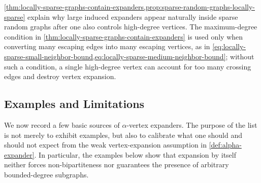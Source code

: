 \cref{thm:locally-sparse-graphs-contain-expanders,prop:sparse-random-graphs-locally-sparse} explain why large induced expanders appear naturally inside sparse random graphs after one also controls high-degree vertices. The maximum-degree condition in \cref{thm:locally-sparse-graphs-contain-expanders} is used only when converting many escaping edges into many escaping vertices, as in \cref{eq:locally-sparse-small-neighbor-bound,eq:locally-sparse-medium-neighbor-bound}; without such a condition, a single high-degree vertex can account for too many crossing edges and destroy vertex expansion.

\subsection{Examples and Limitations}
\label{subsec:examples-alpha-expanders}

We now record a few basic sources of \(\alpha\)-vertex expanders. The purpose of the list is not merely to exhibit examples, but also to calibrate what one should and should not expect from the weak vertex-expansion assumption in \cref{def:alpha-expander}. In particular, the examples below show that expansion by itself neither forces non-bipartiteness nor guarantees the presence of arbitrary bounded-degree subgraphs.

